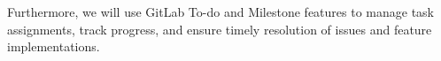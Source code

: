 Furthermore, we will use GitLab To-do and Milestone features to manage task
assignments, track progress, and ensure timely resolution of issues and feature
implementations.









